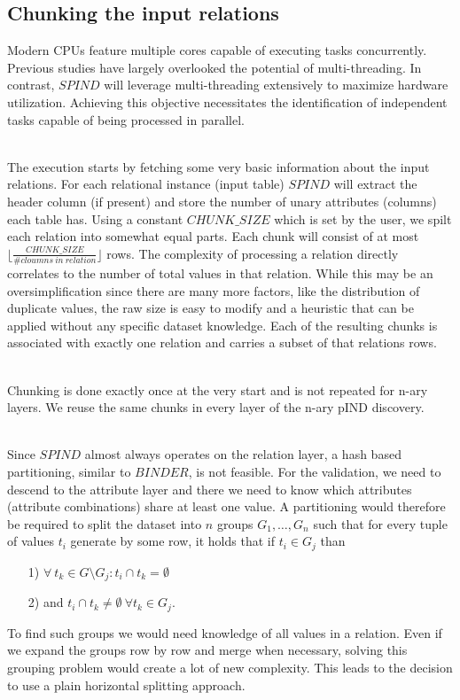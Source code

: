 \subsection{Chunking the input relations}
Modern CPUs feature multiple cores capable of executing tasks concurrently. Previous studies have largely overlooked the potential of multi-threading. In contrast, $SPIND$ will leverage multi-threading extensively to maximize hardware utilization. Achieving this objective necessitates the identification of independent tasks capable of being processed in parallel.

\noindent \\ The execution starts by fetching some very basic information about the input relations. For each relational instance (input table) $SPIND$ will extract the header column (if present) and store the number of unary attributes (columns) each table has. Using a constant $CHUNK\_SIZE$ which is set by the user, we spilt each relation into somewhat equal parts. Each chunk will consist of at most $\lfloor \frac{CHUNK\_SIZE}{\# cloumns \: in \: relation} \rfloor$ rows. The complexity of processing a relation directly correlates to the number of total values in that relation. While this may be an oversimplification since there are many more factors, like the distribution of duplicate values, the raw size is easy to modify and a heuristic that can be applied without any specific dataset knowledge. Each of the resulting chunks is associated with exactly one relation and carries a subset of that relations rows.

\noindent \\ Chunking is done exactly once at the very start and is not repeated for n-ary layers. We reuse the same chunks in every layer of the n-ary pIND discovery.

\noindent \\ Since $SPIND$ almost always operates on the relation layer, a hash based partitioning, similar to $BINDER$, is not feasible. For the validation, we need to descend to the attribute layer and there we need to know which attributes (attribute combinations) share at least one value. A partitioning would therefore be required to split the dataset into $n$ groups $G_1, \dots, G_n$ such that for every tuple of values $t_i$ generate by some row, it holds that if $t_i \in G_j$ than 
\begin{itemize}
    \item[1)] $\forall \: t_k \in G \setminus G_j : t_i \cap t_k = \emptyset$
    \item[2)] and $t_i \cap t_k \not = \emptyset \: \forall t_k \in G_j$.
\end{itemize}
To find such groups we would need knowledge of all values in a relation. Even if we expand the groups row by row and merge when necessary, solving this grouping problem would create a lot of new complexity. This leads to the decision to use a plain horizontal splitting approach.


